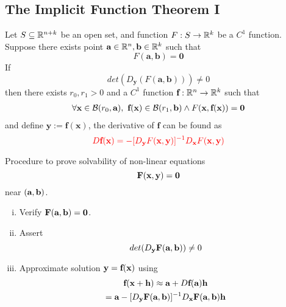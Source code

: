 \documentclass[11pt]{article}
\begin{document}
		\subsection{The Implicit Function Theorem I}
			\begin{theorem}
				Let $S \subseteq \mathbb{R}^{n+k}$ be an open set, and function $F: S \to \mathbb{R}^k$ be a $C^1$ function. Suppose there exists point $\textbf{a} \in \mathbb{R}^n, \textbf{b} \in \mathbb{R}^k$ such that 
				\begin{equation}
					F(\textbf{a}, \textbf{b}) = \textbf{0}
				\end{equation}
				If 
				\begin{equation}
					det(D_{\textbf{y}}(F(\textbf{a}, \textbf{b}))) \neq 0
				\end{equation}
				then there exists $r_0, r_1 > 0$ and a $C^1$ function $\textbf{f}: \mathbb{R}^n \to \mathbb{R}^k$ such that
				\begin{gather}
					\forall \ve{x} \in \mc{B}(r_0, \ve{a}),\ \ve{f}(\ve{x}) \in \mc{B}(r_1, \ve{b}) \land F(\ve{x}, \ve{f}(\ve{x})) = \ve{0}
				\end{gather}
				and define $\textbf{y} := \textbf{f}(\textbf{x})$, the derivative of $\textbf{f}$ can be found as
				\begin{equation}
					\textcolor{red}{D\textbf{f}(\textbf{x}) = -[D_{\textbf{y}}F(\textbf{x}, \textbf{y})]^{-1} D_{\textbf{x}}F(\textbf{x}, \textbf{y})}
				\end{equation}
			\end{theorem}
			\begin{remark}
				Procedure to prove solvability of non-linear equations
				\begin{equation}
					\textbf{F}(\textbf{x}, \textbf{y}) = \textbf{0}
				\end{equation}
				near $(\textbf{a}, \textbf{b})$.
				\begin{enumerate}[(i)]
					\item Verify $\textbf{F}(\textbf{a}, \textbf{b}) = \textbf{0}$.
					\item Assert
					\begin{equation}
						det(D_{\textbf{y}}\textbf{F}(\textbf{a}, \textbf{b})) \neq 0
					\end{equation}
					\item Approximate solution $\textbf{y} = \textbf{f}(\textbf{x})$ using 
					\begin{gather}
						\textbf{f}(\textbf{x} + \textbf{h}) \approx \textbf{a} + D\textbf{f}(\textbf{a}) \textbf{h} \\
						= \textbf{a}
						- [D_{\textbf{y}} \textbf{F}(\textbf{a}, \textbf{b})]^{-1}
						D_{\textbf{x}} \textbf{F}(\textbf{a}, \textbf{b}) \textbf{h}
					\end{gather}
				\end{enumerate}
			\end{remark}
\end{document}
